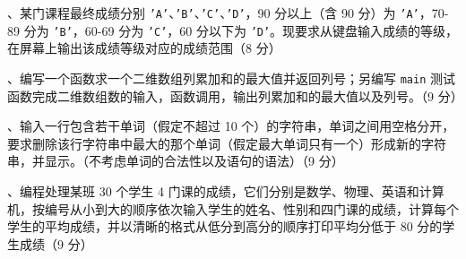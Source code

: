 \documentclass[a4paper,11pt]{ctexart}
\begin{document}
、某门课程最终成绩分别 \texttt{'A'}、\texttt{'B'}、\texttt{'C'}、\texttt{'D'}，90 分以上（含 90 分）为 \texttt{'A'}，70-89 分为 \texttt{'B'}，60-69 分为 \texttt{'C'}，60 分以下为 \texttt{'D'}。现要求从键盘输入成绩的等级，在屏幕上输出该成绩等级对应的成绩范围（8 分）

\vspace{6pt}
、编写一个函数求一个二维数组列累加和的最大值并返回列号；另编写 \texttt{main} 测试函数完成二维数组数的输入，函数调用，输出列累加和的最大值以及列号。（9 分）

\vspace{6pt}
、输入一行包含若干单词（假定不超过 10 个）的字符串，单词之间用空格分开，要求删除该行字符串中最大的那个单词（假定最大单词只有一个）形成新的字符串，并显示。（不考虑单词的合法性以及语句的语法）（9 分）

\vspace{6pt}
、编程处理某班 30 个学生 4 门课的成绩，它们分别是数学、物理、英语和计算机，按编号从小到大的顺序依次输入学生的姓名、性别和四门课的成绩，计算每个学生的平均成绩，并以清晰的格式从低分到高分的顺序打印平均分低于 80 分的学生成绩（9 分）
\end{document}

